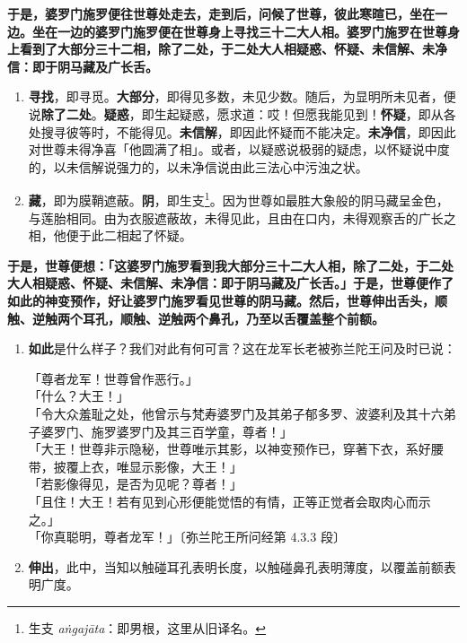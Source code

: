 \textbf{于是，婆罗门施罗便往世尊处走去，走到后，问候了世尊，彼此寒暄已，坐在一边。坐在一边的婆罗门施罗便在世尊身上寻找三十二大人相。婆罗门施罗在世尊身上看到了大部分三十二相，除了二处，于二处大人相疑惑、怀疑、未信解、未净信：即于阴马藏及广长舌。}

\begin{enumerate}\item \textbf{寻找}，即寻觅。\textbf{大部分}，即得见多数，未见少数。随后，为显明所未见者，便说\textbf{除了二处}。\textbf{疑惑}，即生起疑惑，愿求道：哎！但愿我能见到！\textbf{怀疑}，即从各处搜寻彼等时，不能得见。\textbf{未信解}，即因此怀疑而不能决定。\textbf{未净信}，即因此对世尊未得净喜「他圆满了相」。或者，以疑惑说极弱的疑虑，以怀疑说中度的，以未信解说强力的，以未净信说由此三法心中污浊之状。
\item \textbf{藏}，即为膜鞘遮蔽。\textbf{阴}，即生支\footnote{生支 \textit{aṅgajāta}：即男根，这里从旧译名。}。因为世尊如最胜大象般的阴马藏呈金色，与莲胎相同。由为衣服遮蔽故，未得见此，且由在口内，未得观察舌的广长之相，他便于此二相起了怀疑。\end{enumerate}

\textbf{于是，世尊便想：「这婆罗门施罗看到我大部分三十二大人相，除了二处，于二处大人相疑惑、怀疑、未信解、未净信：即于阴马藏及广长舌。」于是，世尊便作了如此的神变预作，好让婆罗门施罗看见世尊的阴马藏。然后，世尊伸出舌头，顺触、逆触两个耳孔，顺触、逆触两个鼻孔，乃至以舌覆盖整个前额。}

\begin{enumerate}\item \textbf{如此}是什么样子？我们对此有何可言？这在龙军长老被弥兰陀王问及时已说：\begin{quoting}「尊者龙军！世尊曾作恶行。」\\「什么？大王！」\\「令大众羞耻之处，他曾示与梵寿婆罗门及其弟子郁多罗、波婆利及其十六弟子婆罗门、施罗婆罗门及其三百学童，尊者！」\\「大王！世尊非示隐秘，世尊唯示其影，以神变预作已，穿著下衣，系好腰带，披覆上衣，唯显示影像，大王！」\\「若影像得见，是否为见呢？尊者！」\\「且住！大王！若有见到心形便能觉悟的有情，正等正觉者会取肉心而示之。」\\「你真聪明，尊者龙军！」{\bluefootnotesize 〔弥兰陀王所问经第 4.3.3 段〕}\end{quoting}
\item \textbf{伸出}，此中，当知以触碰耳孔表明长度，以触碰鼻孔表明薄度，以覆盖前额表明广度。\end{enumerate}

